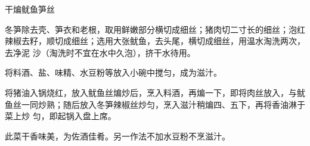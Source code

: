 %
%
%
%
%
%
%
\begin{recipe}{干煸鱿鱼笋丝}

\ingredients


\preparation

\step 冬笋除去壳、笋衣和老根，取用鲜嫩部分横切成细丝；猪肉切二寸长的细丝；泡红
辣椒去籽，顺切成细丝；选用大张鱿鱼，去头尾，横切成细丝，用温水淘洗两次，去净泥
沙（淘洗时不宜在水中久泡），挤干水待用。

\step 将料酒、盐、味精、水豆粉等放入小碗中搅匀，成为滋汁。

\step 将猪油入锅烧红，放入鱿鱼丝煸炒后，烹入料酒，再煸一下，即将肉丝放入，与鱿
鱼丝一同炒熟；随后放入冬笋辣椒丝炒匀，烹入滋汁稍煸四、五下，再将香油淋于菜上炒
匀，即起锅入盘上席。

\features

此菜干香味美，为佐酒佳肴。另一作法不加水豆粉不烹滋汁。

\end{recipe}

